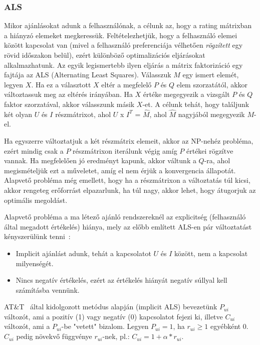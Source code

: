 \documentclass[a4paper,12pt]{article}
\begin{document}
\subsubsection{ALS}
Mikor ajánlásokat adunk a felhasználónak, a célunk az, hogy a rating mátrixban a hiányzó elemeket megkeressük. Feltételezhetjük, hogy a felhasználó elemei között kapcsolat van (mivel a felhasználó preferenciája vélhetően \textsl{rögzített} egy rövid időszakon belül), ezért különböző optimalizációs eljárásokat alkalmazhatunk. Az egyik legismertebb ilyen eljárás a mátrix faktorizáció egy fajtája az ALS (Alternating Least Squares). \newline
Válasszuk $M$ egy ismert elemét, legyen $X$. Ha ez a választott $X$ eltér a megfelelő $P$ és $Q$ elem szorzatától, akkor változtassuk meg az eltérés irányában. Ha $X$ értéke megegyezik a vizsgált $P$ és $Q$ faktor szorzatával, akkor válasszunk másik $X$-et. A célunk tehát, hogy találjunk két olyan $U$ és $I$ részmátrixot, ahol $U$ x $I^T$ = $\hat{M}$, ahol $\hat{M}$ nagyjából megegyezik $M$-el.

Ha egyszerre változtatjuk a két részmátrix elemeit, akkor az NP-nehéz probléma, ezért mindig csak a $P$ részmátrixon iterálunk végig amíg $P$ értékei rögzítve vannak. Ha megfelelően jó eredményt kapunk, akkor váltunk a $Q$-ra, ahol megismételjük ezt a műveletet, amíg el nem érjük a konvergencia állapotát. Alapvető probléma még emellett, hogy ha a részmátrixon a változtatás túl kicsi, akkor rengeteg erőforrást elpazarlunk, ha túl nagy, akkor lehet, hogy átugorjuk az optimális megoldást. \newline

Alapvető probléma a ma létező ajánló rendszereknél az explicitség (felhasználó által megadott értékelés) hiánya, mely az előbb említett ALS-en pár változtatást kényszerülünk tenni~\cite{koren}:
\begin{itemize}
\item Implicit ajánlást adunk, tehát a kapcsolatot $U$ és $I$ között, nem a kapcsolat milyenségét.
\item Nincs negatív értékelés, ezért az értékelés hiányát negatív súllyal kell számításba vennünk.
\end{itemize}

AT\&T~\cite{koren} által kidolgozott metódus alapján (implicit ALS) bevezetünk $P_{ui}$ változót, ami a pozitív (1) vagy negatív (0) kapcsolatot fejezi ki, illetve $C_{ui}$ változót, ami a $P_{ui}$-be "vetett" bizalom. Legyen $P_{ui} = 1$, ha $r_{ui}\geq1$ egyébként 0. $C_{ui}$ pedig növekvő függvénye $r_{ui}$-nek, pl.: $C_{ui}=1+\alpha*r_{ui}$.
\end{document}
